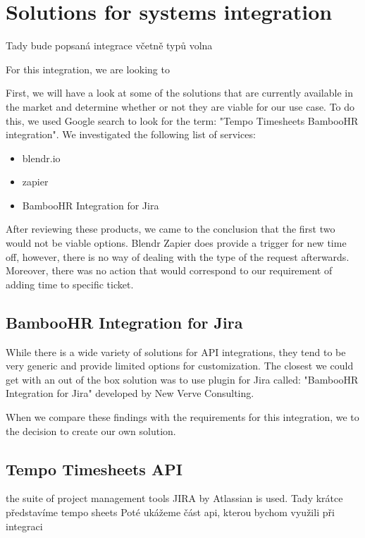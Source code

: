 \documentclass[12pt,oneside]{fithesis2}
\begin{document}
    
    
    \section{Solutions for systems integration}
    Tady bude popsaná integrace včetně typů volna
    
    For this integration, we are looking to 
  
    First, we will have a look at some of the solutions that are currently available in the market and determine whether or not they are viable for our use case. To do this, we used Google search to look for the term: "Tempo Timesheets BambooHR integration". We investigated the following list of services:
    \begin{itemize}
        \setlength\itemsep{0em}
        \item blendr.io 
        \item zapier
        \item BambooHR Integration for Jira
    \end{itemize}
    After reviewing these products, we came to the conclusion that the first two would not be viable options. Blendr \cite{blendr} Zapier does provide a trigger for new time off, however, there is no way of dealing with the type of the request afterwards. Moreover, there was no action that would correspond to our requirement of adding time to specific ticket.\cite{zapier}
    
    \subsection*{BambooHR Integration for Jira}
    While there is a wide variety of solutions for API integrations, they tend to be very generic and provide limited options for customization. The closest we could get with an out of the box solution was to use plugin for Jira called: "BambooHR Integration for Jira" developed by New Verve Consulting.
    
    When we compare these findings with the requirements for this integration, we  to the decision to create our own solution.
    
    \subsection*{Tempo Timesheets API}
    the suite of project management tools JIRA by Atlassian is used.
    Tady krátce představíme tempo sheets
    Poté ukážeme část api, kterou bychom využili při integraci
\end{document}
